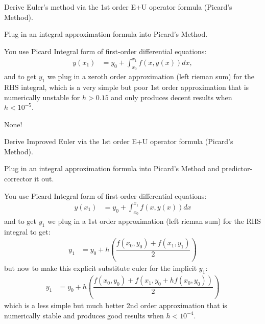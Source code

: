 \documentclass[11pt]{article}
\begin{document}
    \newpage \setcounter{equation}{-1} \begin{problem} 
        Derive Euler's method via the 1st order E+U operator formula (Picard's Method).
    \end{problem}
        \begin{remark}[Method.]
            Plug in an integral approximation formula into Picard's Method.
        \end{remark}
        \begin{solution}[Solution 5a]
            You use Picard Integral form of first-order differential equations:
            \begin{align}
                y(x_1) &= y_0 + \int_{x_0}^{x_1} f(x,y(x)) dx,
            \end{align}
            and to get $y_1$ we plug in a zeroth order approximation (left rieman sum) for the RHS integral,
            which is a very simple but poor 1st order approximation that is numerically unstable for $h>0.15$ and only 
            produces decent results when $h < 10^{-5}$.
        \end{solution}
        \begin{remark}[Footnotes.]
            None!
        \end{remark}
    \newpage \setcounter{equation}{-1} \begin{problem} 
        Derive Improved Euler via the 1st order E+U operator formula (Picard's Method).
    \end{problem}
        \begin{remark}[Method.]
            Plug in an integral approximation formula into Picard's Method and predictor-corrector it out.
        \end{remark}
        \begin{solution}[Solution 5b]
            You use Picard Integral form of first-order differential equations:
            \begin{align}
                y(x_1) &= y_0 + \int_{x_0}^{x_1} f(x,y(x)) dx
            \end{align}
            and to get $y_1$ we plug in a 1st order approximation (left rieman sum) for the RHS integral to get:
            \begin{align}
                y_1 &= y_0 + h\left(\dfrac{f(x_0,y_0) + f(x_1,y_1)}{2}\right)
            \end{align}
            but now to make this explicit substitute euler for the implicit $y_1$:
            \begin{align}
                y_1 &= y_0 + h\left(\dfrac{f(x_0,y_0) + f(x_1,y_0+hf(x_0,y_0))}{2}\right)
            \end{align}which is a less simple but much better 2nd order approximation that is numerically stable and
            produces good results when $h < 10^{-4}$.
        \end{solution}
\end{document}
